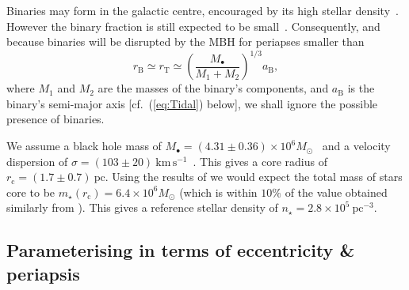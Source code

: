 \documentclass[useAMS,usedcolumn,usegraphicx,usenatbib]{mn2e}
\newcommand{\eqnref}[1]{(\ref{eq:#1})}
\newcommand{\units}[1]{\ensuremath{~\mathrm{#1}}}
\newcommand{\sub}[1]{\ensuremath{_\mathrm{#1}}}
\begin{document}
Binaries may form in the galactic centre, encouraged by its high stellar density~\citep{O'Leary2009}. However the binary fraction is still expected to be small~\citep{Hopman2009}. Consequently, and because binaries will be disrupted by the MBH for periapses smaller than
\begin{equation}
r\sub{B}  \simeq r\sub{T} \simeq \left(\frac{M_\bullet}{M_1 + M_2}\right)^{1/3}a\sub{B},
\end{equation}
where $M_1$ and $M_2$ are the masses of the binary's components, and $a\sub{B}$ is the binary's semi-major axis [cf.\ \eqnref{Tidal} below], we shall ignore the possible presence of binaries.

We assume a black hole mass of $M_\bullet = (4.31 \pm 0.36) \times 10^6 M_\odot$~\citep{Gillessen2009} and a velocity dispersion of $\sigma = (103 \pm 20)\units{km\,s^{-1}}$~\citep{Tremaine2002}. This gives a core radius of $r\sub{c} = (1.7 \pm 0.7)\units{pc}$. Using the results of \citet{Ghez2008} we would expect the total mass of stars core to be $m_\star(r\sub{c}) = 6.4 \times 10^6 M_\odot$ (which is within $10\%$ of the value obtained similarly from \citealt{Genzel2003}). This gives a reference stellar density of $n_\star = 2.8 \times 10^5\units{pc^{-3}}$.

\subsection{Parameterising in terms of eccentricity \& periapsis}
\end{document}
